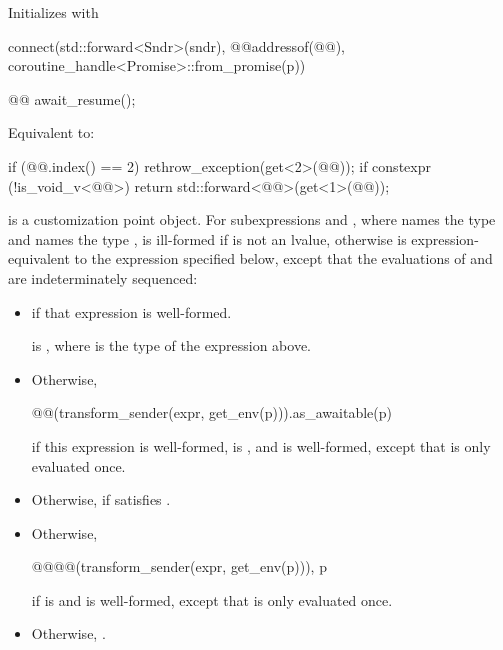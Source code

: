 \begin{itemdescr}
\pnum
\effects
Initializes  with
\begin{codeblock}
connect(std::forward<Sndr>(sndr),
        @@{addressof(@@), coroutine_handle<Promise>::from_promise(p)})
\end{codeblock}
\end{itemdescr}

\begin{itemdecl}
@@ await_resume();
\end{itemdecl}

\begin{itemdescr}
\pnum
\effects
Equivalent to:
\begin{codeblock}
if (@@.index() == 2)
  rethrow_exception(get<2>(@@));
if constexpr (!is_void_v<@@>)
  return std::forward<@@>(get<1>(@@));
\end{codeblock}
\end{itemdescr}

\pnum
{} is a customization point object.
For subexpressions  and , where
 names the type  and
 names the type ,
 is ill-formed if  is not an lvalue,
otherwise  is expression-equivalent to
the expression specified below,
except that the evaluations of  and 
are indeterminately sequenced:
\begin{itemize}
\item
{} if that expression is well-formed.

\mandates
{} is ,
where  is the type of the expression above.
\item
Otherwise,
\begin{codeblock}
@@(transform_sender(expr, get_env(p))).as_awaitable(p)
\end{codeblock}
if this expression is well-formed,
 is , and
is well-formed,
except that  is only evaluated once.
\item
Otherwise, 
if 
satisfies .
\item
Otherwise,
\begin{codeblock}
@@{@@(transform_sender(expr, get_env(p))), p}
\end{codeblock}
if  is  and
is well-formed,
except that  is only evaluated once.
\item
Otherwise, .
\end{itemize}

